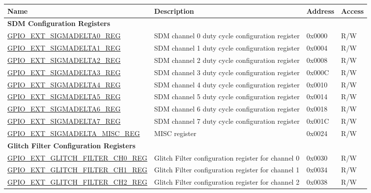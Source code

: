 \begin{longtable}{ | p{6.2cm} | p{7cm} | p{1.3cm} | p{1cm} | }
\hline\rowcolor{lightgray}
\textbf{Name} & \textbf{Description} &  \textbf{Address} & \textbf{Access} \\ \hline
\endhead
\multicolumn{4}{|l|}{\textbf{SDM Configuration Registers}} \\ \hline
\hyperref[regdesc:GPIOSDSIGMADELTANREG]{GPIO\_EXT\_SIGMADELTA0\_REG} & SDM channel 0 duty cycle configuration register & 0x0000 & R/W \\ \hline
\hyperref[regdesc:GPIOSDSIGMADELTANREG]{GPIO\_EXT\_SIGMADELTA1\_REG} & SDM channel 1 duty cycle configuration register & 0x0004 & R/W \\ \hline
\hyperref[regdesc:GPIOSDSIGMADELTANREG]{GPIO\_EXT\_SIGMADELTA2\_REG} & SDM channel 2 duty cycle configuration register & 0x0008 & R/W \\ \hline
\hyperref[regdesc:GPIOSDSIGMADELTANREG]{GPIO\_EXT\_SIGMADELTA3\_REG} & SDM channel 3 duty cycle configuration register & 0x000C & R/W \\ \hline
\hyperref[regdesc:GPIOSDSIGMADELTANREG]{GPIO\_EXT\_SIGMADELTA4\_REG} & SDM channel 4 duty cycle configuration register & 0x0010 & R/W \\ \hline
\hyperref[regdesc:GPIOSDSIGMADELTANREG]{GPIO\_EXT\_SIGMADELTA5\_REG} & SDM channel 5 duty cycle configuration register & 0x0014 & R/W \\ \hline
\hyperref[regdesc:GPIOSDSIGMADELTANREG]{GPIO\_EXT\_SIGMADELTA6\_REG} & SDM channel 6 duty cycle configuration register & 0x0018 & R/W \\ \hline
\hyperref[regdesc:GPIOSDSIGMADELTANREG]{GPIO\_EXT\_SIGMADELTA7\_REG} & SDM channel 7 duty cycle configuration register & 0x001C & R/W \\ \hline
\hyperref[regdesc:GPIOSDSIGMADELTAMISCREG]{GPIO\_EXT\_SIGMADELTA\_MISC\_REG} & MISC register & 0x0024 & R/W \\ \hline
\multicolumn{4}{|l|}{\textbf{Glitch Filter Configuration Registers}} \\ \hline
\hyperref[regdesc:GPIOSDGLITCHFILTERCHNREG]{GPIO\_EXT\_GLITCH\_FILTER\_CH0\_REG} & Glitch Filter configuration register for channel 0 & 0x0030 & R/W \\ \hline
\hyperref[regdesc:GPIOSDGLITCHFILTERCHNREG]{GPIO\_EXT\_GLITCH\_FILTER\_CH1\_REG} & Glitch Filter configuration register for channel 1 & 0x0034 & R/W \\ \hline
\hyperref[regdesc:GPIOSDGLITCHFILTERCHNREG]{GPIO\_EXT\_GLITCH\_FILTER\_CH2\_REG} & Glitch Filter configuration register for channel 2 & 0x0038 & R/W \\ \hline

\end{longtable}

